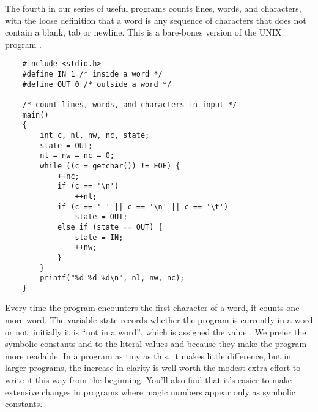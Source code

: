 The fourth in our series of useful programs counts lines, words, and characters, with the loose definition that a word is any sequence of characters that does not contain a blank, tab or newline.
This is a bare-bones version of the UNIX program .
\begin{lstlisting}
	#include <stdio.h>
	#define IN 1 /* inside a word */
	#define OUT 0 /* outside a word */

	/* count lines, words, and characters in input */
	main()
	{
		int c, nl, nw, nc, state;
		state = OUT;
		nl = nw = nc = 0;
		while ((c = getchar()) != EOF) {
			++nc;
			if (c == '\n')
				++nl;
			if (c == ' ' || c == '\n' || c == '\t')
				state = OUT;
			else if (state == OUT) {
				state = IN;
				++nw;
			}
		}
		printf("%d %d %d\n", nl, nw, nc);
	}
\end{lstlisting}
Every time the program encounters the first character of a word, it counts one more word.
The variable state records whether the program is currently in a word or not; initially it is ``not in a word'', which is assigned the value .
We prefer the symbolic constants  and  to the literal values  and  because they make the program more readable.
In a program as tiny as this, it makes little difference, but in larger programs, the increase in clarity is well worth the modest extra effort to write it this way from the beginning.
You'll also find that it's easier to make extensive changes in programs where magic numbers appear only as symbolic constants.

